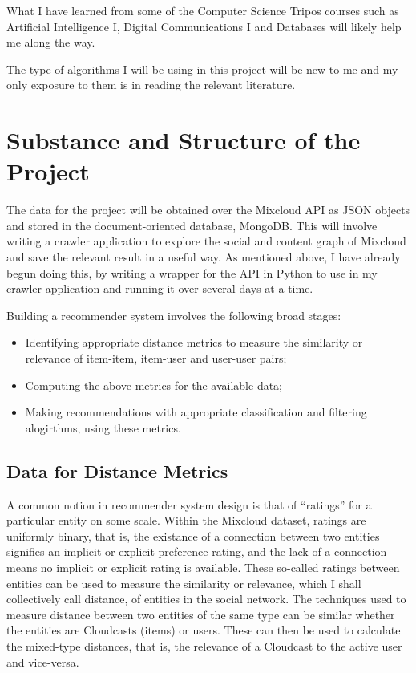 What I have learned from some of the Computer Science Tripos courses such as 
Artificial Intelligence I, Digital Communications I and Databases will likely 
help me along the way.

The type of algorithms I will be using in this project will be new to me and my 
only exposure to them is in reading the relevant literature.
  
\section{Substance and Structure of the Project}

The data for the project will be obtained over the Mixcloud API as JSON objects 
and stored in the document-oriented database, MongoDB. This will involve 
writing a crawler application to explore the social and content graph of 
Mixcloud and save the relevant result in a useful way. As mentioned above, I 
have already begun doing this, by writing a wrapper for the API in Python to 
use in my crawler application and running it over several days at a time.

Building a recommender system involves the following broad stages: 
\begin{itemize}
 \item Identifying appropriate distance metrics to measure the similarity or 
relevance of item-item, item-user and user-user pairs;
 \item Computing the above metrics for the available data;
 \item Making recommendations with appropriate classification and filtering 
alogirthms, using these metrics.
\end{itemize}

\subsection*{Data for Distance Metrics}

A common notion in recommender system design is that of ``ratings'' for a 
particular entity on some scale. Within the Mixcloud dataset, ratings are 
uniformly binary, that is, the existance of a connection between two entities 
signifies an implicit or explicit preference rating, and the lack of a 
connection means no implicit or explicit rating is available. These so-called 
ratings between entities can be used to measure the similarity or relevance, 
which I shall collectively call distance, of entities in the social network. 
The techniques used to measure distance between two entities of the same type 
can be similar whether the entities are Cloudcasts (items) or users. These can 
then be used to calculate the mixed-type distances, that is, the relevance of a 
Cloudcast to the active user and vice-versa.


